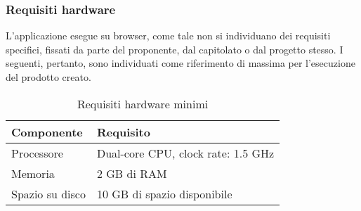 \subsubsection{Requisiti hardware}
L’applicazione esegue su browser, come tale non si individuano dei requisiti specifici, fissati da parte
del proponente, dal capitolato o dal progetto stesso. I seguenti, pertanto, sono individuati come
riferimento di massima per l’esecuzione del prodotto creato. 
\begin{table}[H]
    \centering
    \begin{tabular}{ll}
        \toprule
        \textbf{Componente} & \textbf{Requisito} \\
        \midrule
        Processore & Dual-core CPU, clock rate: 1.5 GHz \\
        Memoria & 2 GB di RAM \\
        Spazio su disco & 10 GB di spazio disponibile \\
        \bottomrule
    \end{tabular}
    \caption{Requisiti hardware minimi}
\end{table}